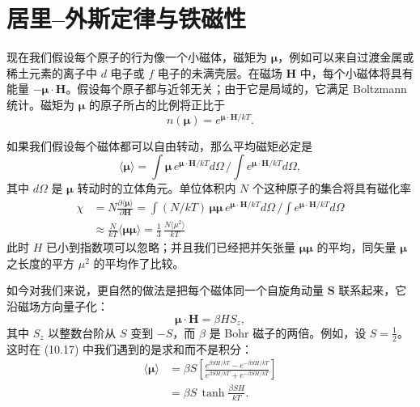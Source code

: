 \section{居里--外斯定律与铁磁性}

现在我们假设每个原子的行为像一个小磁体，磁矩为 $\boldsymbol{\mu}$，例如可以来自过渡金属或稀土元素的离子中 $d$ 电子或 $f$ 电子的未满壳层。在磁场 $\mathbf{H}$ 中，每个小磁体将具有能量 $-\boldsymbol{\mu}\cdot\mathbf{H}$。假设每个原子都与近邻无关；由于它是局域的，它满足 Boltzmann 统计。磁矩为 $\boldsymbol{\mu}$ 的原子所占的比例将正比于
\begin{equation*}
n(\boldsymbol{\mu})=e^{\boldsymbol{\mu}\cdot\mathbf{H}/kT}.
\tag{10.16}
\end{equation*}

如果我们假设每个磁体都可以自由转动，那么平均磁矩必定是
\begin{equation*}
\langle\boldsymbol{\mu}\rangle=\int\boldsymbol{\mu}\,e^{\boldsymbol{\mu}\cdot\mathbf{H}/kT}d\Omega\,\Big/\int e^{\boldsymbol{\mu}\cdot\mathbf{H}/kT}d\Omega,
\tag{10.17}
\end{equation*}
其中 $d\Omega$ 是 $\boldsymbol{\mu}$ 转动时的立体角元。单位体积内 $N$ 个这种原子的集合将具有磁化率
\begin{align*}
\chi &=N\frac{\partial\langle\boldsymbol{\mu}\rangle}{\partial\mathbf{H}}=\int(N/kT)\,\boldsymbol{\mu}\boldsymbol{\mu}\,e^{\boldsymbol{\mu}\cdot\mathbf{H}/kT}d\Omega\,\Big/\int e^{\boldsymbol{\mu}\cdot\mathbf{H}/kT}d\Omega\\
&\approx\frac{N}{kT}\langle\boldsymbol{\mu}\boldsymbol{\mu}\rangle=\frac{1}{3}\,\frac{N\langle\mu^{2}\rangle}{kT}
\tag{10.18}
\end{align*}
此时 $H$ 已小到指数项可以忽略；并且我们已经把并矢张量 $\boldsymbol{\mu}\boldsymbol{\mu}$ 的平均，同矢量 $\boldsymbol{\mu}$ 之长度的平方 $\mu^{2}$ 的平均作了比较。

如今对我们来说，更自然的做法是把每个磁体同一个自旋角动量 $\mathbf{S}$ 联系起来，它沿磁场方向量子化：
\begin{equation*}
\boldsymbol{\mu}\cdot\mathbf{H}=\beta HS_{z},
\tag{10.19}
\end{equation*}
其中 $S_{z}$ 以整数台阶从 $S$ 变到 $-S$，而 $\beta$ 是 Bohr 磁子的两倍。例如，设 $S=\frac{1}{2}$。这时在 (10.17) 中我们遇到的是求和而不是积分：
\begin{align*}
\langle\boldsymbol{\mu}\rangle &=\beta S\left[\frac{e^{\beta SH/kT}-e^{-\beta SH/kT}}{e^{\beta SH/kT}+e^{-\beta SH/kT}}\right]\\
&=\beta S\,\tanh\frac{\beta SH}{kT}.
\tag{10.20}
\end{align*}

